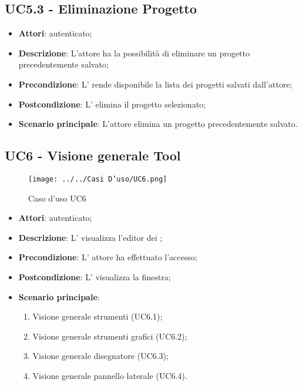 \subsection{UC5.3 - Eliminazione Progetto}
\label{ssec:UC5.3}
\begin{itemize}
\item \textbf{Attori}:  autenticato;
\item \textbf{Descrizione}: L'attore ha la possibilità di eliminare un progetto precedentemente salvato;
\item \textbf{Precondizione}: L’ rende disponibile la lista dei progetti salvati dall'attore;
\item \textbf{Postcondizione}: L’ elimina il progetto selezionato;
\item \textbf{Scenario principale}: L'attore elimina un progetto precedentemente salvato.
\end{itemize}
\newpage
\subsection{UC6 - Visione generale Tool }
\label{ssec:UC6}
\begin{figure}[h!]
\centering
\texttt{[image: ../../Casi D'uso/UC6.png]}
\caption{Caso d'uso UC6}
 \end{figure}
\begin{itemize}
\item \textbf{Attori}:  autenticato;
\item \textbf{Descrizione}: L' visualizza l'editor dei ;
\item \textbf{Precondizione}: L' attore ha effettuato l'accesso;
\item \textbf{Postcondizione}: L' visualizza la finestra;
\item \textbf{Scenario principale}: \begin{enumerate}\item Visione generale strumenti (UC6.1);\item Visione generale strumenti grafici (UC6.2);\item Visione generale disegnatore  (UC6.3);\item Visione generale pannello laterale (UC6.4).
 \end{enumerate}
\end{itemize}
\newpage
